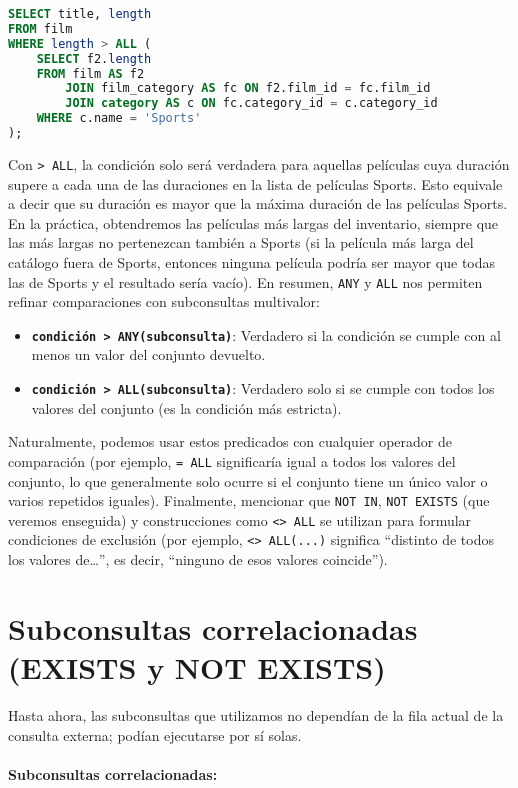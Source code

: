 \documentclass[12pt,a4paper]{article}
\begin{document}
\begin{lstlisting}[language=SQL]
SELECT title, length
FROM film
WHERE length > ALL (
	SELECT f2.length
	FROM film AS f2
		JOIN film_category AS fc ON f2.film_id = fc.film_id
		JOIN category AS c ON fc.category_id = c.category_id
	WHERE c.name = 'Sports'
);
\end{lstlisting}


Con \texttt{> ALL}, la condición solo será verdadera para aquellas películas cuya duración supere a cada una de las duraciones en la lista de películas Sports.
%
Esto equivale a decir que su duración es mayor que la máxima duración de las películas Sports.
%
En la práctica, obtendremos las películas más largas del inventario, siempre que las más largas no pertenezcan también a Sports (si la película más larga del catálogo fuera de Sports, entonces ninguna película podría ser mayor que todas las de Sports y el resultado sería vacío).
%
En resumen, \texttt{ANY} y \texttt{ALL} nos permiten refinar comparaciones con subconsultas multivalor:



\begin{itemize}
\item \textbf{\texttt{condición > ANY(subconsulta)}}: Verdadero si la condición se cumple con al menos un valor del conjunto devuelto.
\item \textbf{\texttt{condición > ALL(subconsulta)}}: Verdadero solo si se cumple con todos los valores del conjunto (es la condición más estricta).
\end{itemize}
Naturalmente, podemos usar estos predicados con cualquier operador de comparación (por ejemplo, \texttt{= ALL} significaría igual a todos los valores del conjunto, lo que generalmente solo ocurre si el conjunto tiene un único valor o varios repetidos iguales).
%
Finalmente, mencionar que \texttt{NOT IN}, \texttt{NOT EXISTS} (que veremos enseguida) y construcciones como \texttt{<> ALL} se utilizan para formular condiciones de exclusión (por ejemplo, \texttt{<> ALL(...)} significa “distinto de todos los valores de…”, es decir, “ninguno de esos valores coincide”). \section{Subconsultas correlacionadas (EXISTS y NOT EXISTS)} Hasta ahora, las subconsultas que utilizamos no dependían de la fila actual de la consulta externa; podían ejecutarse por sí solas.

\paragraph{Subconsultas correlacionadas:}
\end{document}
